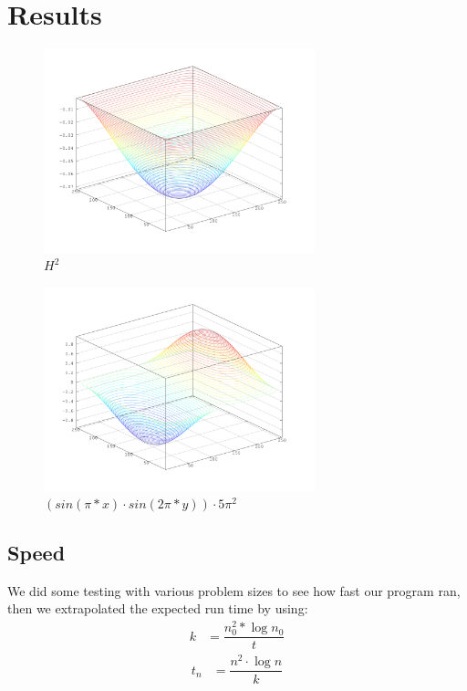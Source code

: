 \newpage
\section{Results}
\begin{figure}[H]
  \centering
    \includegraphics[width=0.7\textwidth]{datashit512flat_v2.png}
    \caption{$H^2$}
\end{figure}
\FloatBarrier
\begin{figure}[H]
  \centering
    \includegraphics[width=0.7\textwidth]{datashit512sinpixsin2pix_v2.png}
    \caption{$(sin(\pi*x)\cdot sin(2\pi*y))\cdot 5\pi^2$}
\end{figure}
\FloatBarrier

\subsection{Speed}
We did some testing with various problem sizes to see how fast our program ran, then we
extrapolated the expected run time by using:
\begin{align}
k &= 
    \dfrac{n_{0}^2*\log{n_{0}}}{t}
\end{align}
\begin{align}    
t_{n} &= \dfrac
        {n^2\cdot\log{n}}
        {k} 
\end{align}

